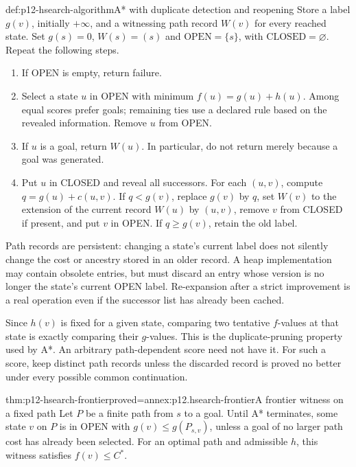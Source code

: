 \begin{hbmethod}{def:p12-hsearch-algorithm}{A* with duplicate detection and reopening}
Store a label \(g(v)\), initially \(+\infty\), and a witnessing path
record \(W(v)\) for every reached state. Set \(g(s)=0\), \(W(s)=(s)\)
and \(\mathrm{OPEN}=\{s\}\), with \(\mathrm{CLOSED}=\varnothing\).
Repeat the following steps.
\begin{enumerate}
\item If OPEN is empty, return failure.
\item Select a state \(u\) in OPEN with minimum
  \(f(u)=g(u)+h(u)\). Among equal scores prefer goals; remaining ties
  use a declared rule based on the revealed information. Remove \(u\)
  from OPEN.
\item If \(u\) is a goal, return \(W(u)\). In particular, do not
  return merely because a goal was generated.
\item Put \(u\) in CLOSED and reveal all successors. For each
  \((u,v)\), compute \(q=g(u)+c(u,v)\). If \(q<g(v)\), replace
  \(g(v)\) by \(q\), set \(W(v)\) to the extension of the current
  record \(W(u)\) by \((u,v)\), remove \(v\) from CLOSED if present,
  and put \(v\) in OPEN. If \(q\ge g(v)\), retain the old label.
\end{enumerate}
Path records are persistent: changing a state's current label does not
silently change the cost or ancestry stored in an older record. A heap
implementation may contain obsolete entries, but must discard an entry
whose version is no longer the state's current OPEN label. Re-expansion
after a strict improvement is a real operation even if the successor list
has already been cached.
\end{hbmethod}

Since \(h(v)\) is fixed for a given state, comparing two tentative
\(f\)-values at that state is exactly comparing their \(g\)-values.
This is the duplicate-pruning property used by A*. An arbitrary
path-dependent score need not have it. For such a score, keep distinct
path records unless the discarded record is proved no better under
every possible common continuation.

\begin{hblemma}{thm:p12-hsearch-frontier}{proved=annex:p12.hsearch-frontier}{A frontier witness on a fixed path}
Let \(P\) be a finite path from \(s\) to a goal. Until A* terminates,
some state \(v\) on \(P\) is in OPEN with
\(g(v)\le g(P_{s,v})\), unless a goal of no larger path cost has
already been selected. For an optimal path and admissible \(h\), this
witness satisfies \(f(v)\le C^*\).
\end{hblemma}

